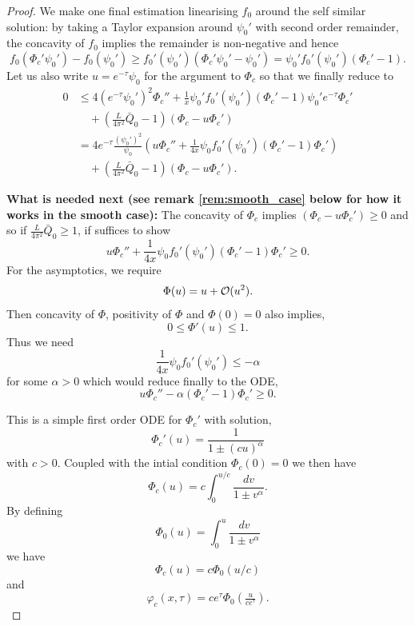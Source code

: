 \documentclass[12pt]{amsart}
\begin{document}
\begin{proof}
We make one final estimation linearising $f_0$ around the self similar solution: by taking a Taylor expansion around $\psi_0'$ with second order remainder, the concavity of $f_0$ implies the remainder is non-negative and hence
\[
f_0(\Phi_c' \psi_0') - f_0(\psi_0') \geq f_0'(\psi_0')(\Phi_c'\psi_0' - \psi_0') = \psi_0' f_0'(\psi_0')(\Phi_c' - 1).
\]
Let us also write $u = e^{-\tau} \psi_0$ for the argument to $\Phi_c$ so that we finally reduce to
\begin{equation}
\label{eq:Phi_ode}
\begin{split}
0 &\leq 4 (e^{-\tau} \psi_0')^2 \Phi_c'' + \frac{1}{x} \psi_0' f_0'(\psi_0')(\Phi_c' - 1) \psi_0' e^{-\tau} \Phi_c' \\
&\quad + \left(\frac{L}{4\pi^2} \bar{Q}_0 - 1\right) \left(\Phi_c - u \Phi_c'\right) \\
&= 4 e^{-\tau} \frac{(\psi_0')^2}{\psi_0} \left(u \Phi_c'' + \frac{1}{4x} \psi_0 f_0'(\psi_0')(\Phi_c' - 1) \Phi_c'\right) \\
&\quad + \left(\frac{L}{4\pi^2} \bar{Q}_0 - 1\right) \left(\Phi_c - u \Phi_c'\right).
\end{split}
\end{equation}

\textbf{What is needed next (see remark \ref{rem:smooth_case} below for how it works in the smooth case):}
The concavity of $\Phi_c$ implies $\left(\Phi_c - u \Phi_c'\right) \geq 0$ and so if $\frac{L}{4\pi^2} \bar{Q}_0 \geq 1$, if suffices to show
\[
u \Phi_c'' + \frac{1}{4x} \psi_0 f_0'(\psi_0')(\Phi_c' - 1) \Phi_c' \geq 0.
\]
For the asymptotics, we require
\[
\Phi(u) = u + \operatorname{\mathcal{O}}(u^2).
\]
Then concavity of $\Phi$, positivity of $\Phi$ and $\Phi(0) = 0$ also implies,
\[
0 \leq \Phi'(u) \leq 1.
\]
Thus we need
\[
\frac{1}{4x} \psi_0 f_0'(\psi_0') \leq -\alpha
\]
for some $\alpha > 0$ which would reduce finally to the ODE,
\begin{equation}
\label{eq:comparison_ode}
u \Phi_c'' - \alpha (\Phi_c' - 1) \Phi_c' \geq 0.
\end{equation}

This is a simple first order ODE for $\Phi_c'$ with solution,
\[
\Phi_c'(u) = \frac{1}{1 \pm (cu)^{\alpha}}
\]
with $c > 0$. Coupled with the intial condition $\Phi_c(0) = 0$ we then have
\begin{equation}
\label{eq:Phi}
\Phi_c (u) = c \int_0^{u/c} \frac{dv}{1 \pm v^{\alpha}}.
\end{equation}
By defining
\[
\Phi_0(u) = \int_0^{u} \frac{dv}{1 \pm v^{\alpha}}
\]
we have
\[
\Phi_c(u) = c \Phi_0(u/c)
\]
and
\[
\varphi_c(x, \tau) = c e^{\tau} \Phi_0\left(\tfrac{u}{ce^{\tau}}\right).
\]


\end{proof}
\end{document}

